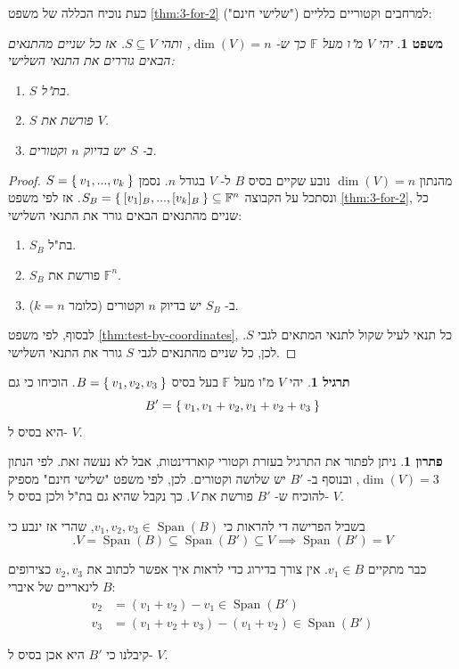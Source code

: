 \documentclass[12pt]{report}
\theoremstyle{plain}
\newtheorem{theorem}{משפט}[chapter]
\theoremstyle{definition}
\newtheorem{exercise}{תרגיל}[chapter]
\newtheorem*{solution}{פתרון}
\newcommand{\F}{\mathbb{F}}
\newcommand{\0}{\mathbf{0}}
\DeclareMathOperator{\Span}{Span}
\begin{document}
כעת נוכיח הכללה של משפט
\ref{thm:3-for-2}
("שלישי חינם")
למרחבים וקטוריים כלליים:
\begin{theorem}\label{thm:3-for-2-V}
יהי
$V$
מ"ו מעל
$\F$
כך ש-
$\dim(V)=n$,
ותהי
$S\subseteq V$.
אז כל שניים מהתנאים הבאים גוררים את התנאי השלישי:

\begin{enumerate}[label=\alph*.]
\item
$S$
בת"ל.


\item
$S$
פורשת את
$V$.


\item
ב-
$S$
יש בדיוק 
$n$
וקטורים.


\end{enumerate}
\end{theorem}

\begin{proof}
מהנתון 
$\dim(V)=n$
נובע שקיים בסיס
$B$
ל-
$V$
בגודל 
$n$.
נסמן
$S=\Set{v_1,...,v_k}$
ונסתכל על הקבוצה
$S_B=\Set{[v_1]_B,...,[v_k]_B}\subseteq\F^n$.
אז לפי משפט
\ref{thm:3-for-2},
כל שניים מהתנאים הבאים גורר את התנאי השלישי:

\begin{enumerate}[label=\alph*.]
\item
$S_B$
בת"ל.


\item
$S_B$
פורשת את
$\F^n$.


\item
ב-
$S_B$
יש בדיוק
$n$
וקטורים 
(כלומר
$k=n$).


\end{enumerate}

לבסוף, לפי משפט
\ref{thm:test-by-coordinates},
כל תנאי לעיל שקול לתנאי המתאים לגבי 
$S$.
לכן, כל שניים מהתנאים לגבי
$S$
גורר את התנאי השלישי.
\end{proof}

\begin{exercise}
יהי
$V$
מ"ו מעל
$\F$ 
בעל בסיס
$B=\Set{v_1,v_2,v_3}$.
הוכיחו כי גם 
$$
B'=\Set{v_1,v_1+v_2,v_1+v_2+v_3}
$$
היא בסיס ל-
$V$.
\end{exercise}

\begin{solution}
ניתן לפתור את התרגיל בעזרת וקטורי קוארדינטות, אבל לא נעשה זאת. לפי הנתון
$\dim(V)=3$,
ובנוסף ב-
$B'$
יש שלושה וקטורים. לכן, לפי משפט "שלישי חינם" מספיק להוכיח ש-
$B'$
פורשת את 
$V$.
כך נקבל שהיא גם בת"ל ולכן בסיס ל-
$V$.

בשביל הפרישה די להראות כי
$v_1,v_2,v_3\in\Span(B)$,
שהרי אז ינבע כי
$$
.V=\Span(B)\subseteq \Span(B')\subseteq V \implies \Span(B')=V
$$

כבר מתקיים 
$v_1\in B$.
אין צורך בדירוג כדי לראות איך אפשר לכתוב את 
$v_2,v_3$
כצירופים לינאריים של איברי
$B$:
$$
\begin{aligned}
v_2&=(v_1+v_2)-v_1\in\Span(B') \\
v_3&=(v_1+v_2+v_3)-(v_1+v_2)\in\Span(B')
\end{aligned}
$$

קיבלנו כי
$B'$
היא אכן בסיס ל-
$V$.
\end{solution}
\end{document}
